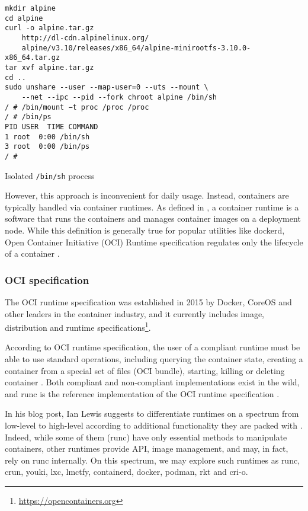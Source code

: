 \begin{listing}[htp]
  \centering
  \begin{minipage}{0.9\linewidth}
      \begin{verbatim}
mkdir alpine
cd alpine
curl -o alpine.tar.gz
    http://dl-cdn.alpinelinux.org/
    alpine/v3.10/releases/x86_64/alpine-minirootfs-3.10.0-x86_64.tar.gz
tar xvf alpine.tar.gz
cd ..
sudo unshare --user --map-user=0 --uts --mount \ 
    --net --ipc --pid --fork chroot alpine /bin/sh
/ # /bin/mount −t proc /proc /proc
/ # /bin/ps
PID USER  TIME COMMAND
1 root  0:00 /bin/sh
3 root  0:00 /bin/ps
/ #
      \end{verbatim}
  \end{minipage}
  \caption{Isolated \texttt{/bin/sh} process}
  \label{lst:isolated_process}
\end{listing}

However, this approach is inconvenient for daily usage. Instead, containers are typically handled via container runtimes. As defined in \cite{c:4}, a container runtime is a software that runs the containers and manages container images on a deployment node. While this definition is generally true for popular utilities like dockerd, Open Container Initiative (OCI) Runtime specification regulates only the lifecycle of a container \cite{b:ianlewis1}.

\subsubsection{OCI specification}

The OCI runtime specification was established in 2015 by Docker, CoreOS and other leaders in the container industry, and it currently includes image, distribution and runtime specifications\footnote{\url{https://opencontainers.org}}.

According to OCI runtime specification, the user of a compliant runtime must be able to use standard operations, including querying the container state, creating a container from a special set of files (OCI bundle), starting, killing or deleting container \cite{d:ocirunspec}. Both compliant and non-compliant implementations exist in the wild, and runc is the reference implementation of the OCI runtime specification \cite{c:4}.

In his blog post, Ian Lewis suggests to differentiate runtimes on a spectrum from low-level to high-level according to additional functionality they are packed with \cite{b:ianlewis1}. Indeed, while some of them (runc) have only essential methods to manipulate containers, other runtimes provide API, image management, and may, in fact, rely on runc internally. On this spectrum, we may explore such runtimes as runc, crun, youki, lxc, lmctfy, containerd, docker, podman, rkt and cri-o.

